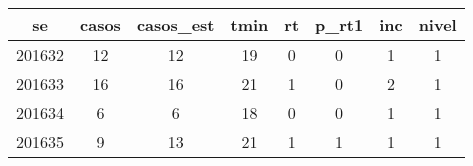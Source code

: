 \begin{tabular}{c|ccccccc}
  \hline
se & casos & casos\_est & tmin & rt & p\_rt1 & inc & nivel \\ 
  \hline
201632 & 12 & 12 & 19 & 0 & 0 & 1 & 1 \\ 
  201633 & 16 & 16 & 21 & 1 & 0 & 2 & 1 \\ 
  201634 & 6 & 6 & 18 & 0 & 0 & 1 & 1 \\ 
  201635 & 9 & 13 & 21 & 1 & 1 & 1 & 1 \\ 
   \hline
\end{tabular}
